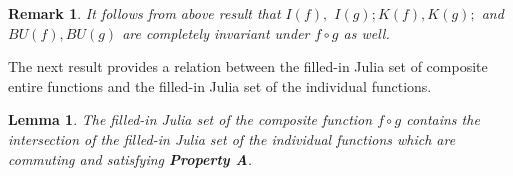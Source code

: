 \documentclass[a4paper,12pt]{amsart}
\numberwithin{equation}{section}
\newtheorem{lemma}[theorem]{Lemma}
\newtheorem{remark}[theorem]{Remark}
\begin{document}
\begin{remark}
It follows from above result that   $I(f),$ $I(g); K(f), K(g);$ and $BU(f), BU(g)$ are completely invariant under  $f \circ g$ as well.
\end{remark}

%

The next result provides a relation between the filled-in Julia set of composite entire functions and the filled-in Julia set of the individual functions.
\begin{lemma}\label{lem2.3}
The filled-in Julia set of the composite function $f\circ g$ contains the intersection of the filled-in Julia set of the individual functions which are commuting  and satisfying \textbf{Property A}.
\end{lemma}
\end{document}
